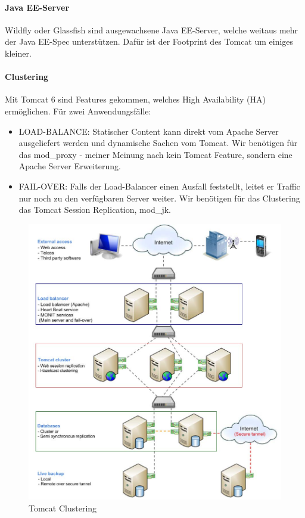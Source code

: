 \paragraph{Java EE-Server}
Wildfly oder Glassfish sind ausgewachsene Java EE-Server, welche weitaus mehr der Java EE-Spec unterstützen. Dafür ist der Footprint des Tomcat um einiges kleiner.

\newpage
\paragraph{Clustering}
Mit Tomcat 6 sind Features gekommen, welches High Availability (HA) ermöglichen. Für zwei Anwendungsfälle:
\begin{itemize}
	\item LOAD-BALANCE: Statischer Content kann direkt vom Apache Server ausgeliefert werden und dynamische Sachen vom Tomcat. Wir benötigen für das mod\_proxy - meiner Meinung nach kein Tomcat Feature, sondern eine Apache Server Erweiterung.
	\item FAIL-OVER: Falls der Load-Balancer einen Ausfall feststellt, leitet er Traffic nur noch zu den verfügbaren Server weiter. Wir benötigen für das Clustering das Tomcat Session Replication, mod\_jk.
\end{itemize}

\begin{figure}[h!]
\centering
\includegraphics[width=0.7\linewidth]{fig/java-tomcat-clustering}
\caption{Tomcat Clustering}
\label{fig:java-tomcat-clustering}
\end{figure}

